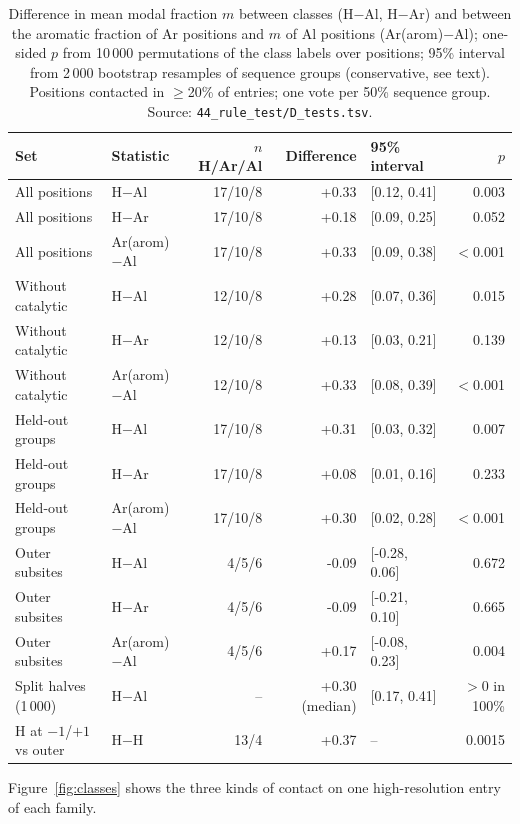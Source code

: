 \documentclass[preprint,12pt]{elsarticle}
\begin{document}
\begin{table}[h]
\centering\renewcommand{\baselinestretch}{1}\scriptsize\setlength{\tabcolsep}{3pt}
\caption{Difference in mean modal fraction $m$ between classes (H$-$Al, H$-$Ar) and between the aromatic fraction of Ar positions and $m$ of Al positions (Ar(arom)$-$Al); one-sided $p$ from 10\,000 permutations of the class labels over positions; 95\% interval from 2\,000 bootstrap resamples of sequence groups (conservative, see text). Positions contacted in $\ge$20\% of entries; one vote per 50\% sequence group. Source: \texttt{44\_rule\_test/D\_tests.tsv}.}
\label{tab:tests}
\begin{tabular}{llrrlr}
\toprule
Set & Statistic & $n$ H/Ar/Al & Difference & 95\% interval & $p$\\
\midrule
All positions & H$-$Al & 17/10/8 & +0.33 & [0.12, 0.41] & 0.003\\
All positions & H$-$Ar & 17/10/8 & +0.18 & [0.09, 0.25] & 0.052\\
All positions & Ar(arom)$-$Al & 17/10/8 & +0.33 & [0.09, 0.38] & $<$0.001\\
\addlinespace
Without catalytic & H$-$Al & 12/10/8 & +0.28 & [0.07, 0.36] & 0.015\\
Without catalytic & H$-$Ar & 12/10/8 & +0.13 & [0.03, 0.21] & 0.139\\
Without catalytic & Ar(arom)$-$Al & 12/10/8 & +0.33 & [0.08, 0.39] & $<$0.001\\
\addlinespace
Held-out groups & H$-$Al & 17/10/8 & +0.31 & [0.03, 0.32] & 0.007\\
Held-out groups & H$-$Ar & 17/10/8 & +0.08 & [0.01, 0.16] & 0.233\\
Held-out groups & Ar(arom)$-$Al & 17/10/8 & +0.30 & [0.02, 0.28] & $<$0.001\\
\addlinespace
Outer subsites & H$-$Al & 4/5/6 & -0.09 & [-0.28, 0.06] & 0.672\\
Outer subsites & H$-$Ar & 4/5/6 & -0.09 & [-0.21, 0.10] & 0.665\\
Outer subsites & Ar(arom)$-$Al & 4/5/6 & +0.17 & [-0.08, 0.23] & 0.004\\
\addlinespace
Split halves (1\,000) & H$-$Al & -- & +0.30 (median) & [0.17, 0.41] & $>$0 in 100\%\\
H at $-1$/$+1$ vs outer & H$-$H & 13/4 & +0.37 & -- & 0.0015\\
\bottomrule
\end{tabular}
\end{table}

Figure~\ref{fig:classes} shows the three kinds of contact on one high-resolution entry of each
family.
\end{document}
